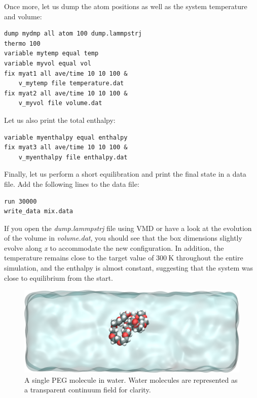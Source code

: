 \documentclass[9pt,tutorial]{livecoms}
\begin{document}
Once more, let us dump the atom positions as well as the system temperature and volume:
{\normalsize \begin{verbatim}
dump mydmp all atom 100 dump.lammpstrj
thermo 100
variable mytemp equal temp
variable myvol equal vol
fix myat1 all ave/time 10 10 100 &
    v_mytemp file temperature.dat
fix myat2 all ave/time 10 10 100 &
    v_myvol file volume.dat
\end{verbatim}}
Let us also print the total enthalpy:
{\normalsize \begin{verbatim}
variable myenthalpy equal enthalpy
fix myat3 all ave/time 10 10 100 &
    v_myenthalpy file enthalpy.dat
\end{verbatim}}
Finally, let us perform a short equilibration and print the
final state in a data file. Add the following lines to the data file:
{\normalsize \begin{verbatim}
run 30000
write_data mix.data
\end{verbatim}}
If you open the \textit{dump.lammpstrj} file using VMD or have a look at the
evolution of the volume in \textit{volume.dat}, you should see that the box
dimensions slightly evolve along \textit{x} to accommodate the new configuration.
In addition, the temperature remains close to the target value of $300~\text{K}$
throughout the entire simulation, and the enthalpy is almost constant, suggesting
that the system was close to equilibrium from the start.

\begin{figure}
\centering
\includegraphics[width=\linewidth]{PEG-solvated}
\caption{A single PEG molecule in water. Water molecules are represented as a
transparent continuum field for clarity.}
\label{fig:PEG-solvated}
\end{figure}
\end{document}
